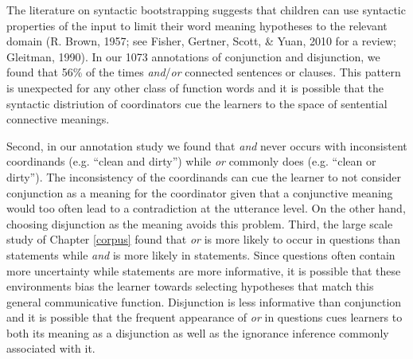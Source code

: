 \documentclass[oneside]{report}
\theoremstyle{definition}
\theoremstyle{definition}
\theoremstyle{definition}
\theoremstyle{remark}
\begin{document}
The literature on syntactic bootstrapping suggests that children can use
syntactic properties of the input to limit their word meaning hypotheses
to the relevant domain (R. Brown, 1957; see Fisher, Gertner, Scott, \&
Yuan, 2010 for a review; Gleitman, 1990). In our 1073 annotations of
conjunction and disjunction, we found that 56\% of the times
\emph{and}/\emph{or} connected sentences or clauses. This pattern is
unexpected for any other class of function words and it is possible that
the syntactic distriution of coordinators cue the learners to the space
of sentential connective meanings.

Second, in our annotation study we found that \emph{and} never occurs
with inconsistent coordinands (e.g. ``clean and dirty'') while \emph{or}
commonly does (e.g. ``clean or dirty''). The inconsistency of the
coordinands can cue the learner to not consider conjunction as a meaning
for the coordinator given that a conjunctive meaning would too often
lead to a contradiction at the utterance level. On the other hand,
choosing disjunction as the meaning avoids this problem. Third, the
large scale study of Chapter \ref{corpus} found that \emph{or} is more
likely to occur in questions than statements while \emph{and} is more
likely in statements. Since questions often contain more uncertainty
while statements are more informative, it is possible that these
environments bias the learner towards selecting hypotheses that match
this general communicative function. Disjunction is less informative
than conjunction and it is possible that the frequent appearance of
\emph{or} in questions cues learners to both its meaning as a
disjunction as well as the ignorance inference commonly associated with
it.
\end{document}
